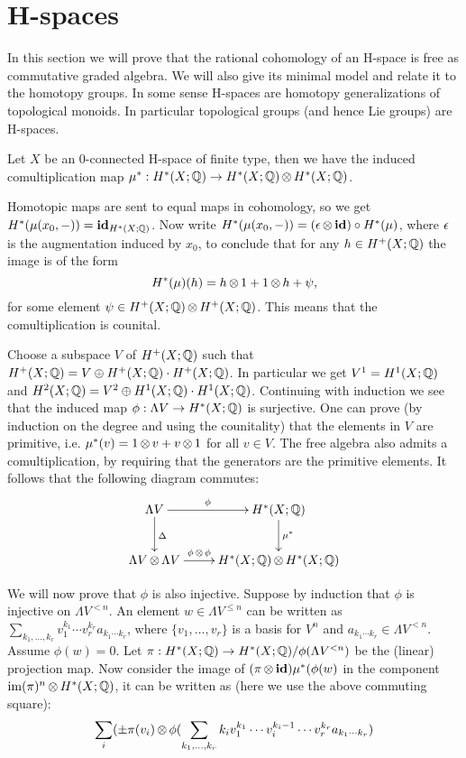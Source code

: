 \section{H-spaces}
In this section we will prove that the rational cohomology of an H-space is free as commutative graded algebra. We will also give its minimal model and relate it to the homotopy groups. In some sense H-spaces are homotopy generalizations of topological monoids. In particular topological groups (and hence Lie groups) are H-spaces.


Let $X$ be an $0$-connected H-space of finite type, then we have the induced comultiplication map $\mu^\ast: H^\ast(X; \mathbb{Q}) \to H^\ast(X; \mathbb{Q}) \operatorname*{\otimes} H^\ast(X; \mathbb{Q})$.

Homotopic maps are sent to equal maps in cohomology, so we get $H^\ast(\mu(x_0, -)) = \mathbf{id}_{H^\ast(X; \mathbb{Q})}$. Now write $H^\ast(\mu(x_0, -)) = (\epsilon \operatorname*{\otimes} \mathbf{id}) \circ H^\ast(\mu)$, where $\epsilon$ is the augmentation induced by $x_0$, to conclude that for any $h \in H^{+}(X; \mathbb{Q})$ the image is of the form
$$ H^\ast(\mu)(h) = h \operatorname*{\otimes} 1 + 1 \operatorname*{\otimes} h + \psi, $$
for some element $\psi \in H^{+}(X; \mathbb{Q}) \operatorname*{\otimes} H^{+}(X; \mathbb{Q})$. This means that the comultiplication is counital.

Choose a subspace $V$ of $H^+(X; \mathbb{Q})$ such that $H^+(X; \mathbb{Q}) = V \oplus H^+(X; \mathbb{Q}) \cdot H^+(X; \mathbb{Q})$. In particular we get $V^1 = H^1(X; \mathbb{Q})$ and $H^2(X; \mathbb{Q}) = V^2 \oplus H^1(X; \mathbb{Q}) \cdot H^1(X; \mathbb{Q})$. Continuing with induction we see that the induced map $\phi : \Lambda V \to H^\ast(X; \mathbb{Q})$ is surjective. One can prove (by induction on the degree and using the counitality) that the elements in $V$ are primitive, i.e. $\mu^\ast(v) = 1 \operatorname*{\otimes} v + v \operatorname*{\otimes} 1$ for all $v \in V$. The free algebra also admits a comultiplication, by requiring that the generators are the primitive elements. It follows that the following diagram commutes:
\[ \xymatrix{
	\Lambda V \ar[r]^-\phi \ar[d]^\Delta & H^\ast(X; \Q) \ar[d]^{\mu^\ast} \\
	\Lambda V \tensor \Lambda V \ar[r]^-{\phi\tensor\phi} & H^\ast(X; \Q) \tensor H^\ast(X; \Q) \\
} \]

We will now prove that $\phi$ is also injective. Suppose by induction that $\phi$ is injective on $\Lambda V^{<n}$. An element $w \in \Lambda V^{\leq n}$ can be written as $\sum_{k_1, \ldots, k_r} v_1^{k_1} \cdots v_r^{k_r} a_{k_1 \cdots k_r}$, where $\{v_1, \ldots, v_r\}$ is a basis for $V^n$ and $a_{k_1 \cdots k_r} \in \Lambda V^{<n}$. Assume $\phi(w) = 0$. Let $\pi : H^\ast(X; \mathbb{Q}) \to H^\ast(X; \mathbb{Q}) / \phi(\Lambda V^{<n})$ be the (linear) projection map. Now consider the image of $(\pi \operatorname*{\otimes} \mathbf{id}) \mu^\ast (\phi(w)$ in the component $\operatorname*{im}(\pi)^n \operatorname*{\otimes} H^\ast(X; \mathbb{Q})$, it can be written as (here we use the above commuting square):
\[ \sum_i ( \pm \pi(v_i) \operatorname*{\otimes} \phi(\sum_{k_1, \ldots, k_r} k_i v_1^{k_1} \cdots v_i^{k_i - 1} \cdots v_r^{k_r}a_{k_1 \cdots k_r}) \]

